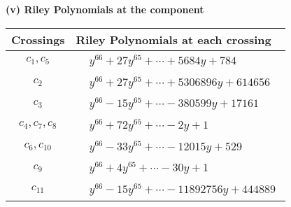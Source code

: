 \documentclass[1p]{elsarticle_modified}
\theoremstyle{definition}
\begin{document}
\flushleft \textbf{(v) Riley Polynomials at the component}\newline \\
\begin{tabular}{m{50pt}|m{274pt}}
Crossings & \hspace{64pt}Riley Polynomials at each crossing \\
\hline $$\begin{aligned}c_{1},c_{5}\end{aligned}$$&$\begin{aligned}
&y^{66}+27 y^{65}+\cdots+5684 y+784
\end{aligned}$\\
\hline $$\begin{aligned}c_{2}\end{aligned}$$&$\begin{aligned}
&y^{66}+27 y^{65}+\cdots+5306896 y+614656
\end{aligned}$\\
\hline $$\begin{aligned}c_{3}\end{aligned}$$&$\begin{aligned}
&y^{66}-15 y^{65}+\cdots-380599 y+17161
\end{aligned}$\\
\hline $$\begin{aligned}c_{4},c_{7},c_{8}\end{aligned}$$&$\begin{aligned}
&y^{66}+72 y^{65}+\cdots-2 y+1
\end{aligned}$\\
\hline $$\begin{aligned}c_{6},c_{10}\end{aligned}$$&$\begin{aligned}
&y^{66}-33 y^{65}+\cdots-12015 y+529
\end{aligned}$\\
\hline $$\begin{aligned}c_{9}\end{aligned}$$&$\begin{aligned}
&y^{66}+4 y^{65}+\cdots-30 y+1
\end{aligned}$\\
\hline $$\begin{aligned}c_{11}\end{aligned}$$&$\begin{aligned}
&y^{66}-15 y^{65}+\cdots-11892756 y+444889
\end{aligned}$\\
\hline
\end{tabular}\\~\\
\end{document}
